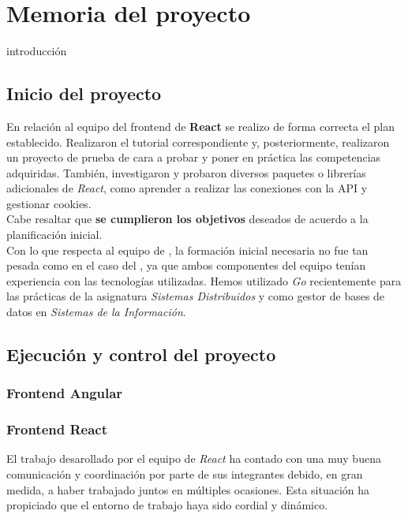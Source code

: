 \documentclass[11pt, a4paper, titlepage]{article}
\begin{document}
\section{Memoria del proyecto}
introducción

\subsection{Inicio del proyecto}
En relación al equipo del frontend de \textbf{React} se realizo de forma correcta el plan establecido. Realizaron el tutorial correspondiente y, posteriormente, realizaron un proyecto de prueba de cara a probar y poner en práctica las competencias adquiridas. También, investigaron y probaron diversos paquetes o librerías adicionales de \textit{React}, como aprender a realizar las conexiones con la API y gestionar cookies. \\
Cabe resaltar que \textbf{se cumplieron los objetivos} deseados de acuerdo a la planificación inicial. \\

Con lo que respecta al equipo de , la formación inicial necesaria no fue tan pesada como en el caso del , ya que ambos componentes del equipo tenían experiencia con las tecnologías utilizadas. Hemos utilizado \textit{Go} recientemente para las prácticas de la asignatura \textit{Sistemas Distribuidos} y  como gestor de bases de datos en \textit{Sistemas de la Información}.

\subsection{Ejecución y control del proyecto}

\subsubsection{Frontend Angular}

\subsubsection{Frontend React}


El trabajo desarollado por el equipo de \textit{React} ha contado con una muy buena comunicación y coordinación por parte de sus integrantes debido, en gran medida, a haber trabajado juntos en múltiples ocasiones. Esta situación ha propiciado que el entorno de trabajo haya sido cordial y dinámico. \\
\end{document}
